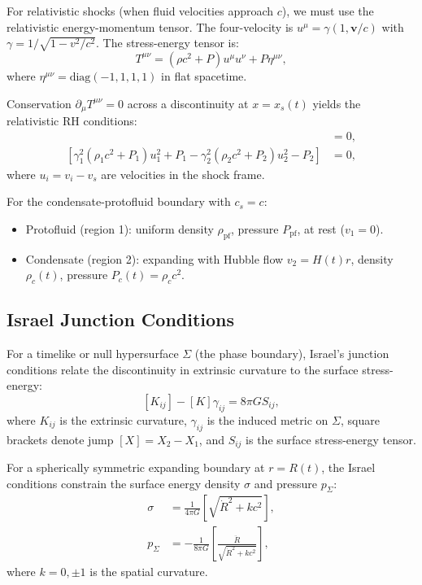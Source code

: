 \documentclass[11pt,a4paper]{article}
\theoremstyle{definition}
\theoremstyle{remark}
\begin{document}
For relativistic shocks (when fluid velocities approach $c$), we must use the relativistic energy-momentum tensor. The four-velocity is $u^\mu = \gamma(1, \mathbf{v}/c)$ with $\gamma = 1/\sqrt{1 - v^2/c^2}$. The stress-energy tensor is:
\begin{equation}
T^{\mu\nu} = (\rho c^2 + P)u^\mu u^\nu + P \eta^{\mu\nu},
\end{equation}
where $\eta^{\mu\nu} = \text{diag}(-1,1,1,1)$ in flat spacetime.

Conservation $\partial_\mu T^{\mu\nu} = 0$ across a discontinuity at $x = x_s(t)$ yields the relativistic RH conditions:
\begin{align}
[\gamma_1(\rho_1 c^2 + P_1)u_1 - \gamma_2(\rho_2 c^2 + P_2)u_2] &= 0, \label{eq:rh_rel_energy} \\
[\gamma_1^2(\rho_1 c^2 + P_1)u_1^2 + P_1 - \gamma_2^2(\rho_2 c^2 + P_2)u_2^2 - P_2] &= 0, \label{eq:rh_rel_momentum}
\end{align}
where $u_i = v_i - v_s$ are velocities in the shock frame.

For the condensate-protofluid boundary with $c_s = c$:
\begin{itemize}[leftmargin=*, itemsep=0.2em]
\item Protofluid (region 1): uniform density $\rho_{\mathrm{pf}}$, pressure $P_{\mathrm{pf}}$, at rest ($v_1 = 0$).
\item Condensate (region 2): expanding with Hubble flow $v_2 = H(t)r$, density $\rho_c(t)$, pressure $P_c(t) = \rho_c c^2$.
\end{itemize}

\subsection{Israel Junction Conditions}
\label{sec:israel_junction}

For a timelike or null hypersurface $\Sigma$ (the phase boundary), Israel's junction conditions \cite{Israel1966} relate the discontinuity in extrinsic curvature to the surface stress-energy:
\begin{equation}
\label{eq:israel_junction}
[K_{ij}] - [K]\gamma_{ij} = 8\pi G S_{ij},
\end{equation}
where $K_{ij}$ is the extrinsic curvature, $\gamma_{ij}$ is the induced metric on $\Sigma$, square brackets denote jump $[X] = X_2 - X_1$, and $S_{ij}$ is the surface stress-energy tensor.

For a spherically symmetric expanding boundary at $r = R(t)$, the Israel conditions constrain the surface energy density $\sigma$ and pressure $p_\Sigma$:
\begin{align}
\sigma &= \frac{1}{4\pi G}\left[\sqrt{\dot{R}^2 + k c^2}\right], \label{eq:surface_energy} \\
p_\Sigma &= -\frac{1}{8\pi G}\left[\frac{\ddot{R}}{\sqrt{\dot{R}^2 + k c^2}}\right], \label{eq:surface_pressure}
\end{align}
where $k = 0, \pm 1$ is the spatial curvature.
\end{document}

